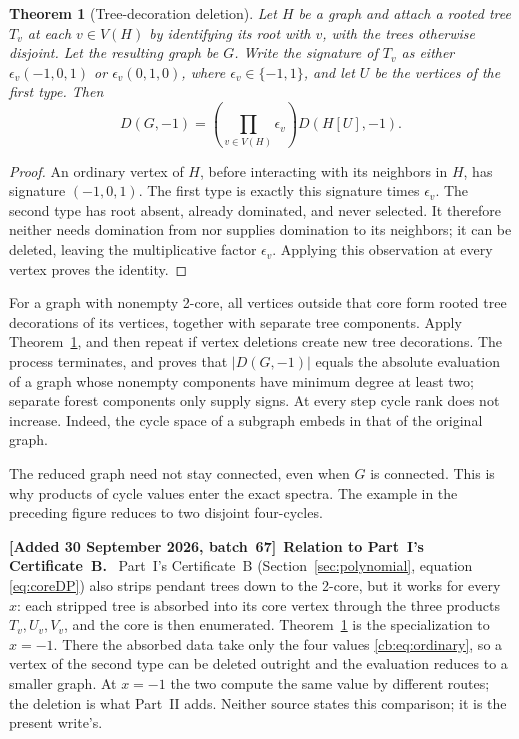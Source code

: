 \documentclass[11pt]{article}
\numberwithin{equation}{section}
\newtheorem{theorem}{Theorem}[section]
\theoremstyle{definition}
\newenvironment{writenote}[1][]{\par\smallskip\begingroup\small\sloppy
 \noindent\textbf{[Added 30 September 2026, batch~67]}\if\relax\detokenize{#1}\relax\else~\textbf{#1.}\fi\ }%
 {\par\endgroup\smallskip}
\begin{document}
\begin{theorem}[Tree-decoration deletion]\label{cb:thm:pruning}
Let $H$ be a graph and attach a rooted tree $T_v$ at each $v\in V(H)$ by
identifying its root with $v$, with the trees otherwise disjoint.
Let the resulting graph be $G$. Write the signature of $T_v$ as either
$\epsilon_v(-1,0,1)$ or $\epsilon_v(0,1,0)$, where $\epsilon_v\in\{-1,1\}$,
and let $U$ be the vertices of the first type. Then
\begin{equation}\label{cb:eq:prune}
 D(G,-1)=\left(\prod_{v\in V(H)}\epsilon_v\right)D(H[U],-1).
\end{equation}
\end{theorem}
\begin{proof}
An ordinary vertex of $H$, before interacting with its neighbors in $H$,
has signature $(-1,0,1)$. The first type is exactly this signature times
$\epsilon_v$. The second type has root absent, already dominated, and
never selected. It therefore neither needs domination from nor supplies
domination to its neighbors; it can be deleted, leaving the multiplicative
factor $\epsilon_v$. Applying this observation at every vertex proves the
identity.
\end{proof}

For a graph with nonempty 2-core, all vertices outside that core form
rooted tree decorations of its vertices, together with separate tree
components. Apply Theorem~\ref{cb:thm:pruning}, and then repeat if vertex
deletions create new tree decorations. The process terminates, and proves
that $|D(G,-1)|$ equals the absolute evaluation of a graph whose nonempty
components have minimum degree at least two; separate forest components
only supply signs. At every step cycle rank does not increase. Indeed,
the cycle space of a subgraph embeds in that of the original graph.

The reduced graph need not stay connected, even when $G$ is connected.
This is why products of cycle values enter the exact spectra. The example
in the preceding figure reduces to two disjoint four-cycles.

\begin{writenote}[Relation to Part~I's Certificate~B]
Part~I's Certificate~B (Section~\ref{sec:polynomial}, equation
\eqref{eq:coreDP}) also strips pendant trees down to the 2-core, but it
works for every \(x\): each stripped tree is absorbed into its core vertex
through the three products \(T_v,U_v,V_v\), and the core is then
enumerated. Theorem~\ref{cb:thm:pruning} is the specialization to
\(x=-1\). There the absorbed data take only the four values
\eqref{cb:eq:ordinary}, so a vertex of the second type can be deleted
outright and the evaluation reduces to a smaller graph. At \(x=-1\) the
two compute the same value by different routes; the deletion is what
Part~II adds. Neither source states this comparison; it is the present
write's.
\end{writenote}
\end{document}
